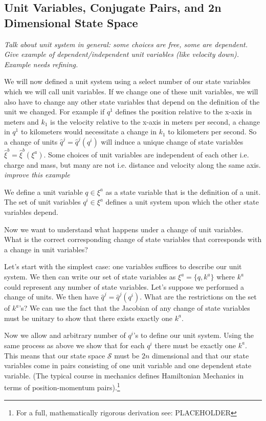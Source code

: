 \documentclass{article}
\begin{document}
\subsection{Unit Variables, Conjugate Pairs, and 2n Dimensional State Space}

\emph{Talk about unit system in general: some choices are free, some are dependent. Give example of dependent/independent unit variables (like velocity down). Example needs refining.}

	We will now defined a unit system using a select number of our state variables which we will call unit variables. If we change one of these unit variables, we will also have to change any other state variables that depend on the definition of the unit we changed. For example if $q^1$ defines the position relative to the x-axis in meters and $k_1$ is the velocity relative to the x-axis in meters per second, a change in $q^1$ to kilometers would necessitate a change in $k_1$ to kilometers per second. So a change of units $\hat{q}^j = \hat{q}^j(q^i)$ will induce a unique change of state variables $\hat{\xi}^b = \hat{\xi}^b(\xi^a)$. Some choices of unit variables are independent of each other i.e. charge and mass, but many are not i.e. distance and velocity along the same axis. \emph{improve this example}

\begin{defn}
	We define a unit variable $q \in \xi^a$ as a state variable that is the definition of a unit. The set of unit variables $q^i \in \xi^a$ defines a unit system upon which the other state variables depend.
\end{defn}

	Now we want to understand what happens under a change of unit variables. What is the correct corresponding change of state variables that corresponds with a change in unit variables? 
	
	Let's start with the simplest case: one variables suffices to describe our unit system. We then can write our set of state variables as $\xi^a = \{q,k^a\}$ where $k^a$ could represent any number of state variables. Let's suppose we performed a change of units. We then have $\hat{q}^j = \hat{q}^j(q^i)$. What are the restrictions on the set of $k^a$'s? We can use the fact that the Jacobian of any change of state variables must be unitary to show that there exists exactly one $k^a$. 
	
	Now we allow and arbitrary number of $q^i$'s to define our unit system. Using the same process as above we show that for each $q^i$ there must be exactly one $k^a$. This means that our state space $\mathcal{S}$ must be $2n$ dimensional and that our state variables come in pairs consisting of one unit variable and one dependent state variable. (The typical course in mechanics defines Hamiltonian Mechanics in terms of position-momentum pairs).\footnote{For a full, mathematically rigorous derivation see: PLACEHOLDER}
\end{document}

